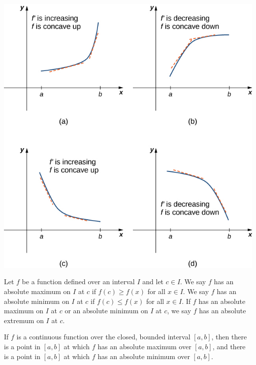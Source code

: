 \documentclass[12pt]{amsart}
\begin{document}
\begin{center}
	\includegraphics{fig3.jpeg}
\end{center}



\begin{definition}
	Let \( f \) be a function defined over an interval \( I \) and let \( c \in I \).
	We say \( f \) has an absolute maximum on \( I \) at \( c \) if \( f(c) \geq f(x) \) for all \( x \in I \).
	We say \( f \) has an absolute minimum on \( I \) at \( c \) if \( f(c) \leq f(x) \) for all \( x \in I \).
	If \( f \) has an absolute maximum on \( I \) at \( c \) or an absolute minimum on \( I \) at \( c \), we say \( f \) has an absolute extremum on \( I \) at \( c \).
\end{definition}


\begin{theorem}
	If \( f \) is a continuous function over the closed, bounded interval \([a, b]\),
	then there is a point in \([a, b]\) at which \( f \) has an absolute maximum over \([a, b]\),
	and there is a point in \([a, b]\) at which \( f \) has an absolute minimum over \([a, b]\).
\end{theorem}
\end{document}
